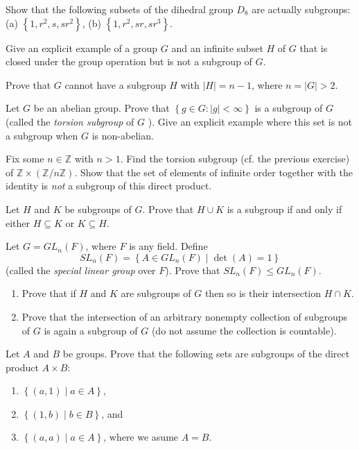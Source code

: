 \documentclass[
    11pt,a4paper,
]{exam}
\begin{document}
\begin{questions}
    \question
    Show that the following subsets of the dihedral group \(D_8\) are actually subgroups:
    (a) \(\left\{1, r^2, s, s r^2\right\}\),
    (b) \(\left\{1, r^2, s r, s r^3\right\}\).
    
    \question
    Give an explicit example of a group \(G\) and an infinite subset \(H\) of \(G\) that is closed under the group operation but is not a subgroup of \(G\).
    
    \question
    Prove that \(G\) cannot have a subgroup \(H\) with \(|H|=n-1\), where \(n=|G|>2\).
    
    
    \question
    Let \(G\) be an abelian group. Prove that \(\left\{g \in G :  |g| <\infty\right\}\) is a subgroup of \(G\) (called the \textit{torsion subgroup} of \(G\) ). Give an explicit example where this set is not a subgroup when \(G\) is non-abelian.
    
    
    \question
    Fix some \(n \in \mathbb{Z}\) with \(n>1\). Find the torsion subgroup (cf. the previous exercise) of \(\mathbb{Z} \times(\mathbb{Z} / n \mathbb{Z})\). Show that the set of elements of infinite order together with the identity is \textit{not} a subgroup of this direct product.
    
    
    \question
    Let \(H\) and \(K\) be subgroups of \(G\). Prove that \(H \cup K\) is a subgroup if and only if either \(H \subseteq K\) or \(K \subseteq H\).
    
    
    \question
    Let \(G=G L_n(F)\), where \(F\) is any field. Define
    \[
    S L_n(F)=\left\{A \in G L_n(F) \mid \operatorname{det}(A)=1\right\}
    \]
    (called the \textit{special linear group} over \(F\)). Prove that \(S L_n(F) \leq G L_n(F)\).
    
    
    \question
    \begin{enumerate}[label=(\alph*)]
        \item Prove that if \({H}\) and \({K}\) are subgroups of \(G\) then so is their intersection \(H \cap {K}\).
        \item Prove that the intersection of an arbitrary nonempty collection of subgroups of \(G\) is again a subgroup of \(G\) (do not assume the collection is countable).
    \end{enumerate}
    
    
    
    \question
    Let \(A\) and \(B\) be groups. Prove that the following sets are subgroups of the direct product \(A \times B\):
    \begin{enumerate}[label=(\alph*)]
        \item \(\left\{ (a,1) \mid a\in A \right\}\),
        \item \(\left\{ (1,b) \mid b\in B \right\}\), and
        \item \(\left\{ (a,a) \mid a\in A \right\}\), where we asume \(A= B\).
    \end{enumerate}
    

\end{questions}
\end{document}
